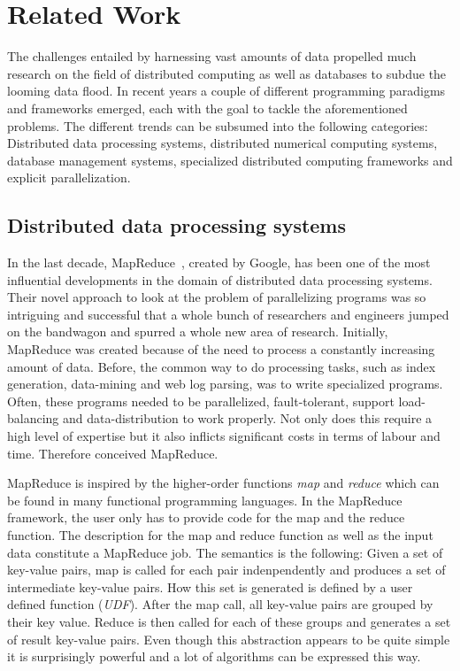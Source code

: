 \chapter{Related Work}
\label{cha:relatedwork}


The challenges entailed by harnessing vast amounts of data propelled much research on the field of distributed computing as well as databases to subdue the looming data flood.
In recent years a couple of different programming paradigms and frameworks emerged, each with the goal to tackle the aforementioned problems.
The different trends can be subsumed into the following categories: Distributed data processing systems, distributed numerical computing systems, database management systems, specialized distributed computing frameworks and explicit parallelization.

\section{Distributed data processing systems}

In the last decade, MapReduce~\cite{dean:c2008a}, created by Google, has been one of the most influential developments in the domain of distributed data processing systems.
Their novel approach to look at the problem of parallelizing programs was so intriguing and successful that a whole bunch of researchers and engineers jumped on the bandwagon and spurred a whole new area of research.
Initially, MapReduce was created because of the need to process a constantly increasing amount of data.
Before, the common way to do processing tasks, such as index generation, data-mining and web log parsing, was to write specialized programs.
Often, these programs needed to be parallelized, fault-tolerant, support load-balancing and data-distribution to work properly.
Not only does this require a high level of expertise but it also inflicts significant costs in terms of labour and time.
Therefore \citeauthor{dean:c2008a} conceived MapReduce.

MapReduce is inspired by the higher-order functions \emph{map} and \emph{reduce} which can be found in many functional programming languages.
In the MapReduce framework, the user only has to provide code for the map and the reduce function.
The description for the map and reduce function as well as the input data constitute a MapReduce job.
The semantics is the following:
Given a set of key-value pairs, map is called for each pair indenpendently and produces a set of intermediate key-value pairs.
How this set is generated is defined by a user defined function (\emph{UDF}).
After the map call, all key-value pairs are grouped by their key value.
Reduce is then called for each of these groups and generates a set of result key-value pairs.
Even though this abstraction appears to be quite simple it is surprisingly powerful and a lot of algorithms can be expressed this way.

